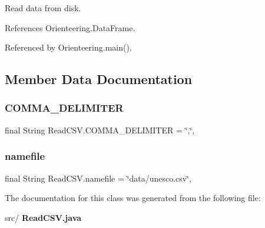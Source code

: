 Read data from disk. 



References Orienteering.\+Data\+Frame.



Referenced by Orienteering.\+main().



\subsection{Member Data Documentation}
\mbox{\label{classReadCSV_a15b5b8ac3804bb7ab4c72567fbc5b874}} 
\subsubsection{C\+O\+M\+M\+A\+\_\+\+D\+E\+L\+I\+M\+I\+T\+ER}
{\footnotesize\ttfamily final String Read\+C\+S\+V.\+C\+O\+M\+M\+A\+\_\+\+D\+E\+L\+I\+M\+I\+T\+ER = \char`\"{},\char`\"{}\hspace{0.3cm}{\ttfamily [static]}, {\ttfamily [private]}}

\mbox{\label{classReadCSV_a2bf0f33db1a72c16c06fde3a9d778c40}} 
\subsubsection{namefile}
{\footnotesize\ttfamily final String Read\+C\+S\+V.\+namefile = \char`\"{}data/unesco.\+csv\char`\"{}\hspace{0.3cm}{\ttfamily [static]}, {\ttfamily [private]}}



The documentation for this class was generated from the following file\+:\begin{DoxyCompactItemize}
\item 
src/\textbf{ Read\+C\+S\+V.\+java}\end{DoxyCompactItemize}
